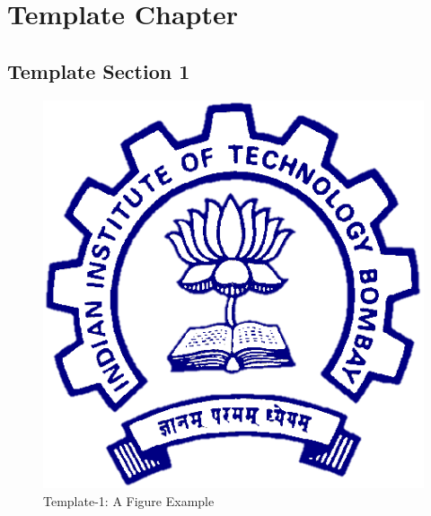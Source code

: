 \documentclass[../../main.tex]{subfiles}
\begin{document}
\chapter{Template Chapter}
\thispagestyle{fancy}

%
%
%
%
%
%
%
%
%

\section{Template Section 1}
\blindtext %

\begin{figure}
    \centering
    \includegraphics[scale=0.3]{Figures/Foreword/iitb_logo.png}
    \caption{Template-1: A Figure Example}
    \label{fig:template_a_figure}
\end{figure}
\end{document}
